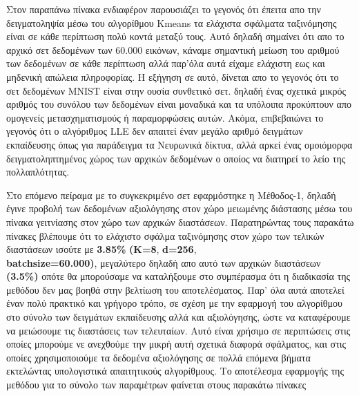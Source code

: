 \par
Στον παραπάνω πίνακα ενδιαφέρον παρουσιάζει το γεγονός ότι έπειτα απο την δειγματοληψία μέσω του αλγορίθμου \textlatin{Kmeans} τα ελάχιστα σφάλματα ταξινόμησης είναι σε κάθε περίπτωση πολύ κοντά μεταξύ τους. Αυτό δηλαδή σημαίνει ότι απο το αρχικό σετ δεδομένων των 60.000 εικόνων, κάναμε σημαντική μείωση του αριθμού των δεδομένων σε κάθε περίπτωση αλλά παρ'όλα αυτά είχαμε ελάχιστη εως και μηδενική απώλεια πληροφορίας. Η εξήγηση σε αυτό, δίνεται απο το γεγονός ότι το σετ δεδομένων \textlatin{MNIST} είναι στην ουσία συνθετικό σετ. δηλαδή ένας σχετικά μικρός αριθμός του συνόλου των δεδομένων είναι μοναδικά και τα υπόλοιπα προκύπτουν απο ομογενείς μετασχηματισμούς ή παραμορφώσεις αυτών. Ακόμα, επιβεβαιώνει το γεγονός ότι ο αλγόριθμος \textlatin{LLE} δεν απαιτεί έναν μεγάλο αριθμό δειγμάτων εκπαίδευσης όπως για παράδειγμα τα Νευρωνικά δίκτυα, αλλά αρκεί ένας ομοιόμορφα δειγματοληπτημένος χώρος των αρχικών δεδομένων ο οποίος να διατηρεί το λείο της πολλαπλότητας.
\par
Στο επόμενο πείραμα με το συγκεκριμένο σετ εφαρμόστηκε η Μέθοδος-1, δηλαδή έγινε προβολή των δεδομένων αξιολόγησης στον χώρο μειωμένης διάστασης μέσω του πίνακα γειτνίασης στον χώρο των αρχικών διαστάσεων. Παρατηρώντας τους παρακάτω πίνακες βλέπουμε ότι το ελάχιστο σφάλμα ταξινόμησης στον χώρο των τελικών διαστάσεων ισούτε με \textbf{3.85\%} \textbf{(\textlatin{K}=8}, \textbf{\textlatin{d}=256}, \\ \textbf{\textlatin{batch\textunderscore size=60.000})}, μεγαλύτερο δηλαδή απο αυτό των αρχικών διαστάσεων \textbf{(3.5\%)} οπότε θα μπορούσαμε να καταλήξουμε στο συμπέρασμα ότι η διαδικασία της μεθόδου δεν μας βοηθά στην βελτίωση του αποτελέσματος. Παρ' όλα αυτά αποτελεί έναν πολύ πρακτικό και γρήγορο τρόπο, σε σχέση με την εφαρμογή του αλγορίθμου στο σύνολο των δειγμάτων εκπαίδευσης αλλά και αξιολόγησης, ώστε να καταφέρουμε να μειώσουμε τις διαστάσεις των τελευταίων. Αυτό είναι χρήσιμο σε περιπτώσεις στις οποίες μπορούμε νε ανεχθούμε την μικρή αυτή σχετικά διαφορά σφάλματος, και στις οποίες χρησιμοποιούμε τα δεδομένα αξιολόγησης σε πολλά επόμενα βήματα εκτελώντας υπολογιστικά απαιτητικούς αλγορίθμους. Το αποτέλεσμα εφαρμογής της μεθόδου για το σύνολο των παραμέτρων φαίνεται στους παρακάτω πίνακες
